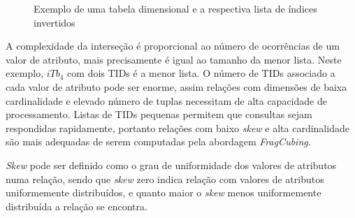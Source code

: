 \begin{figure}[!htb]
	\caption{Exemplo de uma tabela dimensional e a respectiva lista de índices invertidos}\label{fig:fragexample}
	\vspace{2mm}
	\begin{center}
	\end{center}
	\vspace{1mm}
	\legenda{}
\end{figure}

A complexidade da interseção é proporcional ao número de ocorrências de um valor de atributo, mais precisamente é igual ao tamanho da menor lista.
Neste exemplo, $iTb_4$ com dois TIDs é a menor lista.
O número de TIDs associado a cada valor de atributo pode ser enorme, assim relações com dimensões de baixa cardinalidade e elevado número de tuplas necessitam de alta capacidade de processamento.
Listas de TIDs pequenas permitem que consultas sejam respondidas rapidamente, portanto relações com baixo \textit{skew} e alta cardinalidade são mais adequadas de serem computadas pela abordagem \textit{FragCubing}.

\textit{Skew} pode ser definido como o grau de uniformidade dos valores de atributos numa relação, sendo que \textit{skew} zero indica relação com valores de atributos uniformemente distribuídos, e quanto maior o \textit{skew} menos uniformemente distribuída a relação se encontra.


